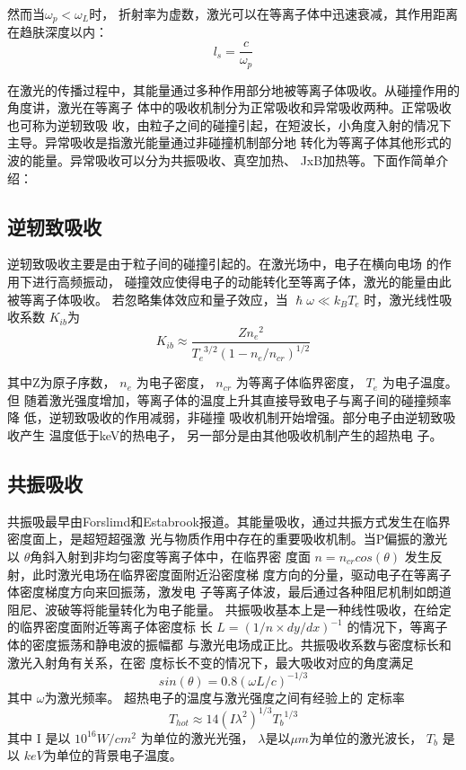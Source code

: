 然而当$\omega_p < \omega_L$时， 
折射率为虚数，激光可以在等离子体中迅速衰减，其作用距离在趋肤深度以内：
\begin{equation}
\label{eqn:skindepth}
l_s=\frac{c}{\omega_p}
\end{equation}


在激光的传播过程中，其能量通过多种作用部分地被等离子体吸收。从碰撞作用的角度讲，激光在等离子
体中的吸收机制分为正常吸收和异常吸收两种。正常吸收也可称为逆轫致吸
收，由粒子之间的碰撞引起，在短波长，小角度入射的情况下主导。异常吸收是指激光能量通过非碰撞机制部分地
转化为等离子体其他形式的波的能量。异常吸收可以分为共振吸收、真空加热、
JxB加热等。下面作简单介绍：
\subsection{逆轫致吸收}
逆轫致吸收主要是由于粒子间的碰撞引起的。在激光场中，电子在横向电场
的作用下进行高频振动， 碰撞效应使得电子的动能转化至等离子体，激光的能量由此被等离子体吸收。
若忽略集体效应和量子效应，当 $ {\hslash} \omega \ll  k_B T_e$ 时，激光线性吸收系数 $K_{ib}$为
\begin{equation}
\label{eqn: laserLinearAbsorbtion}
K_{ib} \approx \frac{Z {n_e}^2}{{T_e}^{3/2} (1-{n_e}/{n_{cr}})^{1/2}}
\end{equation}

其中Z为原子序数， $n_e$ 为电子密度， $n_{cr}$ 为等离子体临界密度， $T_e$ 为电子温度。但
随着激光强度增加，等离子体的温度上升其直接导致电子与离子间的碰撞频率降
低，逆轫致吸收的作用减弱，非碰撞
吸收机制开始增强。部分电子由逆轫致吸收产生
温度低于keV的热电子， 另一部分是由其他吸收机制产生的超热电
子。

\subsection{共振吸收}
共振吸最早由Forslimd\cite{forslund1977theory}和Estabrook\cite{estabrook1978properties}报道。其能量吸收，通过共振方式发生在临界密度面上，是超短超强激
光与物质作用中存在的重要吸收机制。当P偏振的激光以 $\theta$角斜入射到非均匀密度等离子体中，在临界密
度面 $n=n_{cr} cos(\theta)$ 发生反射，此时激光电场在临界密度面附近沿密度梯
度方向的分量，驱动电子在等离子体密度梯度方向来回振荡，激发电
子等离子体波，最后通过各种阻尼机制如朗道阻尼、波破等将能量转化为电子能量。
共振吸收基本上是一种线性吸收，在给定的临界密度面附近等离子体密度标
长 $L=(1/n \times  dy/dx )^{-1}$ 的情况下，等离子体的密度振荡和静电波的振幅都
与激光电场成正比。共振吸收系数与密度标长和激光入射角有关系\cite{kruer1988physics}，在密
度标长不变的情况下，最大吸收对应的角度满足
\begin{equation}
\label{eqn: resonaceformula}
sin(\theta)=0.8 (\omega L/c)^{-1/3}
\end{equation}
其中 $\omega$为激光频率。
超热电子的温度与激光强度之间有经验上的
定标率\cite{forslund1977theory}
\begin{equation}
\label{eqn: resonacescale}
T_{hot} \approx 14(I{\lambda}^2)^{1/3} {T_b}^{1/3}
\end{equation}
其中 I 是以 $10^{16} W/{cm}^2$ 为单位的激光光强， $\lambda$是以$\mu m$为单位的激光波长， $T_b$ 是以
$keV$为单位的背景电子温度。
